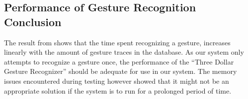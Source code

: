 
\subsection{Performance of Gesture Recognition Conclusion}
The result from  shows that the time spent recognizing a gesture, 
increases linearly with the amount of gesture traces in the database.
As our system only attempts to recognize a gesture once, 
the performance of the ``Three Dollar Gesture Recognizer'' should be adequate for use in our system. 
The memory issues encountered during testing however showed that it might not be an appropriate solution if the system is to run for a prolonged period of time.
